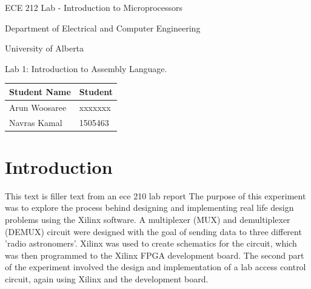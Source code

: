 \documentclass[letterpaper]{article}
\begin{document}
  \begin{titlepage}
    \begin{center}

      \LARGE
      ECE 212 Lab - Introduction to Microprocessors

      Department of Electrical and Computer Engineering

      University of Alberta

      \vspace{2cm}

      Lab 1: Introduction to Assembly Language.

      \vspace{5cm}
      \Large

      \begin{tabular}{ | m{5cm} | m{5cm} | }
        \hline
        Student Name & Student \\
        \hline
        Arun Woosaree & xxxxxxx \\
        \hline
        Navras Kamal & 1505463 \\
        \hline
      \end{tabular}




    \end{center}
\end{titlepage}


\tableofcontents

\newpage

\section{Introduction}
  This text is filler text from an ece 210 lab report
  The purpose of this experiment was to explore the process behind designing and implementing real life design problems using the Xilinx software. A multiplexer (MUX) and demultiplexer (DEMUX) circuit were designed with the goal of sending data to three different 'radio astronomers'. Xilinx was used to create schematics for the circuit, which was then programmed to the Xilinx FPGA development board. The second part of the experiment involved the design and implementation of a lab access control circuit, again using Xilinx and the development board.
\end{document}
